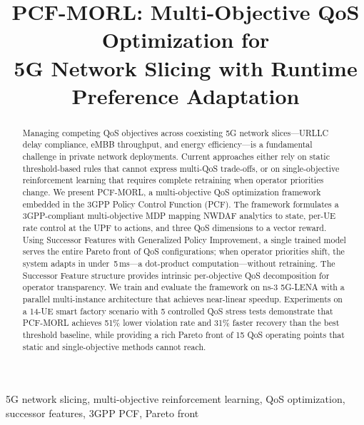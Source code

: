 \documentclass[conference]{IEEEtran}
\begin{document}
\title{PCF-MORL: Multi-Objective QoS Optimization for\\5G Network Slicing with Runtime Preference Adaptation}

\author{
}

\maketitle

\begin{abstract}
Managing competing QoS objectives across coexisting 5G network slices---URLLC delay compliance, eMBB throughput, and energy efficiency---is a fundamental challenge in private network deployments.
Current approaches either rely on static threshold-based rules that cannot express multi-QoS trade-offs, or on single-objective reinforcement learning that requires complete retraining when operator priorities change.
We present PCF-MORL, a multi-objective QoS optimization framework embedded in the 3GPP Policy Control Function (PCF).
The framework formulates a 3GPP-compliant multi-objective MDP mapping NWDAF analytics to state, per-UE rate control at the UPF to actions, and three QoS dimensions to a vector reward.
Using Successor Features with Generalized Policy Improvement, a single trained model serves the entire Pareto front of QoS configurations; when operator priorities shift, the system adapts in under~5\,ms---a dot-product computation---without retraining.
The Successor Feature structure provides intrinsic per-objective QoS decomposition for operator transparency.
We train and evaluate the framework on ns-3 5G-LENA with a parallel multi-instance architecture that achieves near-linear speedup.
Experiments on a 14-UE smart factory scenario with 5 controlled QoS stress tests demonstrate that PCF-MORL achieves 51\% lower violation rate and 31\% faster recovery than the best threshold baseline, while providing a rich Pareto front of 15 QoS operating points that static and single-objective methods cannot reach.
\end{abstract}

\begin{IEEEkeywords}
5G network slicing, multi-objective reinforcement learning, QoS optimization, successor features, 3GPP PCF, Pareto front
\end{IEEEkeywords}
\end{document}
